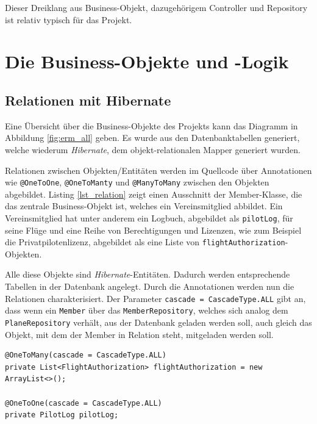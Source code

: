 \documentclass[a4paper, 11pt]{article}
\begin{document}
Dieser Dreiklang aus Business-Objekt, dazugehörigem Controller und Repository
ist relativ typisch für das Projekt.

\section{Die Business-Objekte und -Logik}

\subsection{Relationen mit Hibernate}

Eine Übersicht über die Business-Objekte des Projekts kann das Diagramm in
Abbildung \ref{fig:erm_all} geben. Es wurde aus den Datenbanktabellen
generiert, welche wiederum \emph{Hibernate}, dem objekt-relationalen Mapper
generiert wurden.

Relationen zwischen Objekten/Entitäten werden im Quellcode über Annotationen
wie \lstinline{@OneToOne}, \lstinline{@OneToManty} und \lstinline{@ManyToMany}
zwischen den Objekten abgebildet. Listing \ref{lst_relation} zeigt einen
Ausschnitt der Member-Klasse, die das zentrale Business-Objekt ist, welches ein
Vereinsmitglied abbildet. Ein Vereinsmitglied hat unter anderem ein Logbuch,
abgebildet als \lstinline{pilotLog}, für seine Flüge und eine Reihe von
Berechtigungen und Lizenzen, wie zum Beispiel die Privatpilotenlizenz,
abgebildet als eine Liste von \lstinline{flightAuthorization}-Objekten.

Alle diese Objekte sind \emph{Hibernate}-Entitäten. Dadurch werden
entsprechende Tabellen in der Datenbank angelegt. Durch die Annotationen werden
nun die Relationen charakterisiert. Der Parameter \lstinline{cascade = CascadeType.ALL} gibt an, dass wenn ein \lstinline{Member} über das
\lstinline{MemberRepository}, welches sich analog dem
\lstinline{PlaneRepository} verhält, aus der Datenbank geladen werden soll,
auch gleich das Objekt, mit dem der Member in Relation steht, mitgeladen werden
soll.

\begin{lstlisting}[caption=Verknüpfung zu anderen Entitäten in der Member-Klasse,label=lst_relation]
@OneToMany(cascade = CascadeType.ALL)
private List<FlightAuthorization> flightAuthorization = new ArrayList<>();

@OneToOne(cascade = CascadeType.ALL)
private PilotLog pilotLog;
\end{lstlisting}
\end{document}
